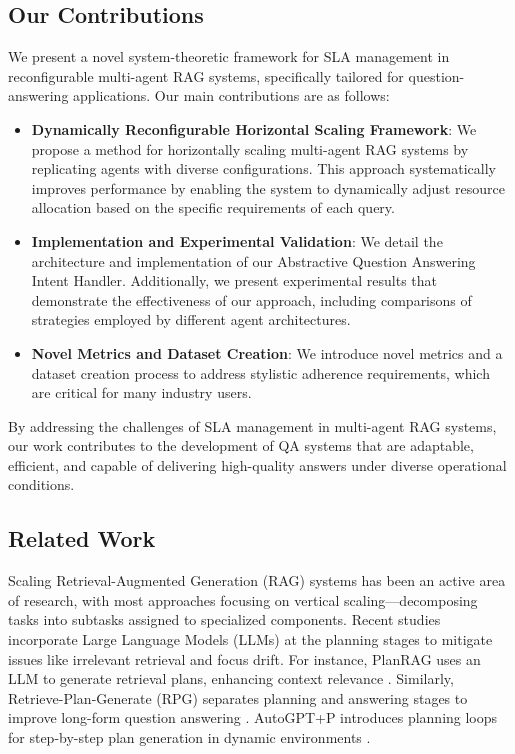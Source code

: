 \documentclass[sigconf,nonacm]{acmart}
\begin{document}
\subsection{Our Contributions}
We present a novel system-theoretic framework for SLA management in reconfigurable multi-agent RAG systems, specifically tailored for question-answering applications. Our main contributions are as follows:
\begin{itemize}
    \item \textbf{Dynamically Reconfigurable Horizontal Scaling Framework}: We propose a method for horizontally scaling multi-agent RAG systems by replicating agents with diverse configurations. This approach systematically improves performance by enabling the system to dynamically adjust resource allocation based on the specific requirements of each query.
    \item \textbf{Implementation and Experimental Validation}: We detail the architecture and implementation of our Abstractive Question Answering Intent Handler. Additionally, we present experimental results that demonstrate the effectiveness of our approach, including comparisons of strategies employed by different agent architectures.
    \item \textbf{Novel Metrics and Dataset Creation}: We introduce novel metrics and a dataset creation process to address stylistic adherence requirements, which are critical for many industry users.
\end{itemize}

By addressing the challenges of SLA management in multi-agent RAG systems, our work contributes to the development of QA systems that are adaptable, efficient, and capable of delivering high-quality answers under diverse operational conditions.

\subsection{Related Work}

Scaling Retrieval-Augmented Generation (RAG) systems has been an active area of research, with most approaches focusing on vertical scaling—decomposing tasks into subtasks assigned to specialized components. Recent studies incorporate Large Language Models (LLMs) at the planning stages to mitigate issues like irrelevant retrieval and focus drift. For instance, PlanRAG uses an LLM to generate retrieval plans, enhancing context relevance \cite{planrag}. Similarly, Retrieve-Plan-Generate (RPG) separates planning and answering stages to improve long-form question answering \cite{rpg2024}. AutoGPT+P introduces planning loops for step-by-step plan generation in dynamic environments \cite{autogpt+p}.
\end{document}
